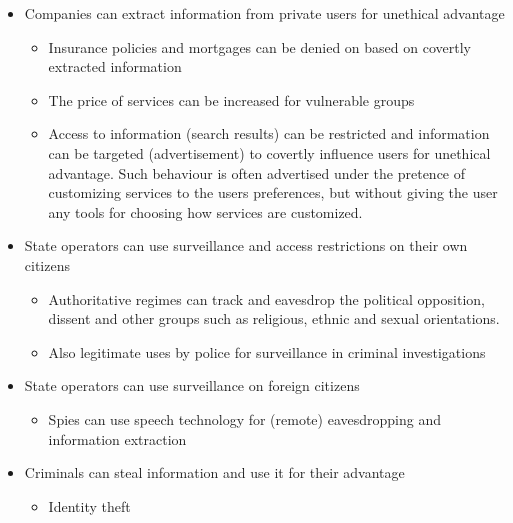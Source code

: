\documentclass[letterpaper,10pt,english]{jupyterBook}
\begin{document}
\begin{itemize}
\item {} 
\sphinxAtStartPar
Companies can extract information from private users for unethical
advantage
\begin{itemize}
\item {} 
\sphinxAtStartPar
Insurance policies and mortgages can be denied on based on
covertly extracted information

\item {} 
\sphinxAtStartPar
The price of services can be increased for vulnerable groups

\item {} 
\sphinxAtStartPar
Access to information (search results) can be restricted and
information can be targeted (advertisement) to covertly
influence users for unethical advantage. Such behaviour is often
advertised under the pretence of customizing services to the
users preferences, but without giving the user any tools for
choosing how services are customized.

\end{itemize}

\item {} 
\sphinxAtStartPar
State operators can use surveillance and access restrictions on
their own citizens
\begin{itemize}
\item {} 
\sphinxAtStartPar
Authoritative regimes can track and eavesdrop the political
opposition, dissent and other groups such as religious, ethnic
and sexual orientations.

\item {} 
\sphinxAtStartPar
Also legitimate uses by police for surveillance in criminal
investigations

\end{itemize}

\item {} 
\sphinxAtStartPar
State operators can use surveillance on foreign citizens
\begin{itemize}
\item {} 
\sphinxAtStartPar
Spies can use speech technology for (remote) eavesdropping and
information extraction

\end{itemize}

\item {} 
\sphinxAtStartPar
Criminals can steal information and use it for their advantage
\begin{itemize}
\item {} 
\sphinxAtStartPar
Identity theft


\end{itemize}
\end{itemize}
\end{document}

